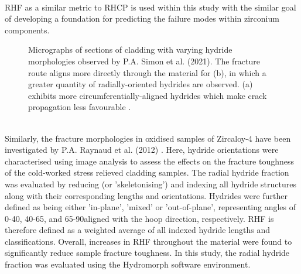 \documentclass{article}
\begin{document}
	\\
	RHF as a similar metric to RHCP is used within this study with the similar goal of developing a foundation for predicting the failure modes within zirconium components.
	\\
	\begin{figure}[h]
		\centering
		\hfill
		\caption{Micrographs of sections of cladding with varying hydride morphologies observed by P.A. Simon et al. (2021). The fracture route aligns more directly through the material for (b), in which a greater quantity of radially-oriented hydrides are observed. (a) exhibits more circumferentially-aligned hydrides which make crack propagation less favourable \cite{Simon2021}.}
		\label{fig:rad_circ_frac}
	\end{figure}
	\\
    Similarly, the fracture morphologies in oxidised samples of Zircaloy-4 have been investigated by P.A. Raynaud et al. (2012) \cite{RAYNAUD201269}. Here, hydride orientations were characterised using image analysis to assess the effects on the fracture toughness of the cold-worked stress relieved cladding samples. The radial hydride fraction was evaluated by reducing (or 'skeletonising') and indexing all hydride structures along with their corresponding lengths and orientations. Hydrides were further defined as being either 'in-plane', 'mixed' or 'out-of-plane', representing angles of 0-40\textdegree, 40-65\textdegree, and 65-90\textdegree aligned with the hoop direction, respectively. RHF is therefore defined as a weighted average of all indexed hydride lengths and classifications. Overall, increases in RHF throughout the material were found to significantly reduce sample fracture toughness. In this study, the radial hydride fraction was evaluated using the Hydromorph software environment.
\end{document}
